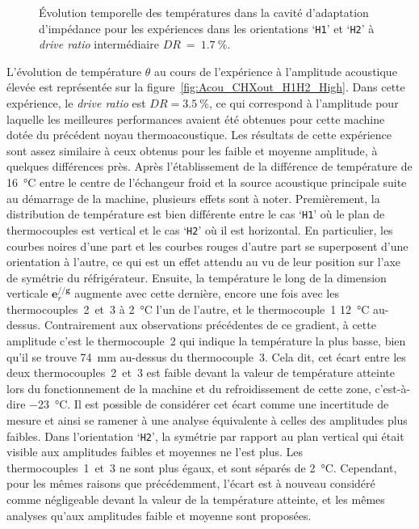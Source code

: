 \begin{figure}[!ht]
    \centering
    
    \caption{\'Evolution temporelle des températures dans la cavité d'adaptation d'impédance pour les expériences dans les orientations `\texttt{H1}' et `\texttt{H2}' à \textit{drive ratio} intermédiaire $DR~=~\qty{1.7}{\percent}$.}
    \label{fig:Acou_CHXout_H1H2_Mid}
\end{figure}

L'évolution de température $\theta$ au cours de l'expérience à l'amplitude acoustique \og élevée \fg{} est représentée sur la figure~\ref{fig:Acou_CHXout_H1H2_High}. Dans cette expérience, le \textit{drive ratio} est $DR=\qty{3.5}{\percent}$, ce qui correspond à l'amplitude pour laquelle les meilleures performances avaient été obtenues pour cette machine dotée du précédent noyau thermoacoustique. Les résultats de cette expérience sont assez similaire à ceux obtenus pour les faible et moyenne amplitude, à quelques différences près. Après l'établissement de la différence de température de \qty{16}{\degreeCelsius} entre le centre de l'échangeur froid et la source acoustique principale suite au démarrage de la machine, plusieurs effets sont à noter. Premièrement, la distribution de température est bien différente entre le cas `\texttt{H1}' où le plan de thermocouples est vertical et le cas `\texttt{H2}' où il est horizontal. En particulier, les courbes noires d'une part et les courbes rouges d'autre part se superposent d'une orientation à l'autre, ce qui est un effet attendu au vu de leur position sur l'axe de symétrie du réfrigérateur. Ensuite, la température le long de la dimension verticale $\mathbf e_r^{//\mathbf g}$ augmente avec cette dernière, encore une fois avec les thermocouples~2~et~3 à \qty{2}{\degreeCelsius} l'un de l'autre, et le thermocouple~1 \qty{12}{\degreeCelsius} au-dessus. Contrairement aux observations précédentes de ce gradient, à cette amplitude c'est le thermocouple~2 qui indique la température la plus basse, bien qu'il se trouve \qty{74}{\milli\meter} au-dessus du thermocouple~3. Cela dit, cet écart entre les deux thermocouples~2~et~3 est faible devant la valeur de température atteinte lors du fonctionnement de la machine et du refroidissement de cette zone, c'est-à-dire \qty{-23}{\degreeCelsius}. Il est possible de considérer cet écart comme une incertitude de mesure et ainsi se ramener à une analyse équivalente à celles des amplitudes plus faibles. Dans l'orientation `\texttt{H2}', la symétrie par rapport au plan vertical qui était visible aux amplitudes faibles et moyennes ne l'est plus. Les thermocouples~1~et~3 ne sont plus égaux, et sont séparés de \qty{2}{\degreeCelsius}. Cependant, pour les mêmes raisons que précédemment, l'écart est à nouveau considéré comme négligeable devant la valeur de la température atteinte, et les mêmes analyses qu'aux amplitudes faible et moyenne sont proposées.

